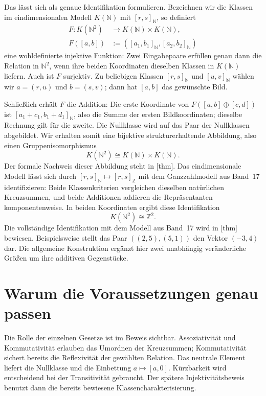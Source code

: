 Das lässt sich als genaue Identifikation formulieren. Bezeichnen
wir die Klassen im eindimensionalen Modell \(K(\mathbb N)\)
mit \([r,s]_{\mathbb N}\), so definiert
\[
  \begin{aligned}
    F\colon K(\mathbb N^2)&\longrightarrow
                    K(\mathbb N)\times K(\mathbb N),\\
    F([a,b])&:=([a_1,b_1]_{\mathbb N},[a_2,b_2]_{\mathbb N})
  \end{aligned}
\]
eine wohldefinierte injektive Funktion: Zwei Eingabepaare
erfüllen genau dann die Relation in \(\mathbb N^2\), wenn
ihre beiden Koordinaten dieselben Klassen in \(K(\mathbb N)\)
liefern. Auch ist \(F\) surjektiv. Zu beliebigen Klassen
\([r,s]_{\mathbb N}\) und \([u,v]_{\mathbb N}\) wählen
wir \(a=(r,u)\) und \(b=(s,v)\); dann hat \([a,b]\)
das gewünschte Bild.

Schließlich erhält \(F\) die Addition: Die erste Koordinate
von \(F([a,b]\oplus[c,d])\) ist
\([a_1+c_1,b_1+d_1]_{\mathbb N}\), also die Summe der
ersten Bildkoordinaten; dieselbe Rechnung gilt für die zweite.
Die Nullklasse wird auf das Paar der Nullklassen abgebildet.
Wir erhalten somit eine bijektive strukturerhaltende Abbildung,
also einen Gruppenisomorphismus
\[
  K(\mathbb N^2)\cong K(\mathbb N)\times K(\mathbb N).
\]
Der formale Nachweis dieser Abbildung steht in
[thm].
Das eindimensionale Modell lässt sich durch
\([r,s]_{\mathbb N}\mapsto[r,s]_{\mathbb Z}\) mit dem
Ganzzahlmodell aus Band~17 identifizieren: Beide Klassenkriterien
vergleichen dieselben natürlichen Kreuzsummen, und beide Additionen
addieren die Repräsentanten komponentenweise. In beiden Koordinaten
ergibt diese Identifikation
\[
  K(\mathbb N^2)\cong\mathbb Z^2.
\]
Die vollständige Identifikation mit dem Modell aus Band~17 wird in
[thm] bewiesen.
Beispielsweise stellt das Paar
\(((2,5),(5,1))\) den Vektor \((-3,4)\) dar.
Die allgemeine Konstruktion ergänzt hier zwei unabhängig
veränderliche Größen um ihre additiven Gegenstücke.

\par{}
\hypertarget{differences.reading.assumptions}{}
\section*{Warum die Voraussetzungen genau passen}

Die Rolle der einzelnen Gesetze ist im Beweis sichtbar.
Assoziativität und Kommutativität erlauben das Umordnen der
Kreuzsummen; Kommutativität sichert bereits die Reflexivität
der gewählten Relation. Das neutrale Element liefert die
Nullklasse und die Einbettung \(a\mapsto[a,0]\).
Kürzbarkeit wird entscheidend bei der Transitivität gebraucht.
Der spätere Injektivitätsbeweis benutzt dann die bereits
bewiesene Klassencharakterisierung.

